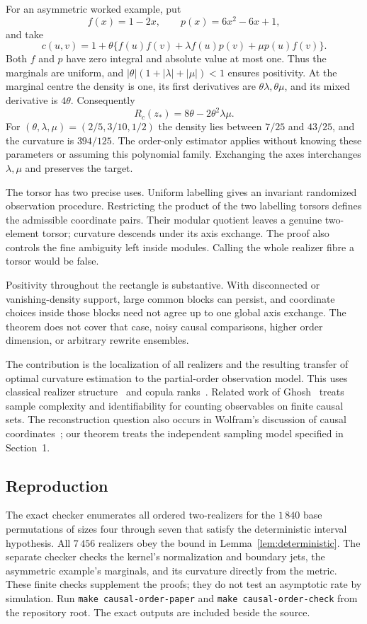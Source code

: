 \documentclass[11pt]{article}
\theoremstyle{remark}
\numberwithin{equation}{section}
\begin{document}
For an asymmetric worked example, put
\[
 f(x)=1-2x,\qquad p(x)=6x^2-6x+1,
\]
and take
\[
 c(u,v)=1+\theta\{f(u)f(v)
             +\lambda f(u)p(v)+\mu p(u)f(v)\}.
\]
Both $f$ and $p$ have zero integral and absolute value at most one.
Thus the marginals are uniform, and
$|\theta|(1+|\lambda|+|\mu|)<1$ ensures positivity.
At the marginal centre the density is one, its first derivatives
are $\theta\lambda,\theta\mu$, and its mixed derivative is $4\theta$.
Consequently
\[
 R_c(z_*)=8\theta-2\theta^2\lambda\mu .
\]
For $(\theta,\lambda,\mu)=(2/5,3/10,1/2)$ the density lies between
$7/25$ and $43/25$, and the curvature is $394/125$.
The order-only estimator applies without knowing these parameters
or assuming this polynomial family.
Exchanging the axes interchanges $\lambda,\mu$ and preserves the target.

The torsor has two precise uses. Uniform labelling gives an invariant
randomized observation procedure. Restricting the product of the two
labelling torsors defines the admissible coordinate pairs.
Their modular quotient leaves a genuine two-element torsor; curvature
descends under its axis exchange. The proof also controls the fine
ambiguity left inside modules. Calling the whole realizer fibre a
torsor would be false.

Positivity throughout the rectangle is substantive.
With disconnected or vanishing-density support, large common blocks
can persist, and coordinate choices inside those blocks need not
agree up to one global axis exchange.
The theorem does not cover that case, noisy causal comparisons,
higher order dimension, or arbitrary rewrite ensembles.

The contribution is the localization of all realizers and the resulting
transfer of optimal curvature estimation to the partial-order observation
model. This uses classical realizer structure~\cite{CP,BBFGP,BCMR} and
copula ranks~\cite{Grubel}. Related work of Ghosh~\cite{Ghosh} treats
sample complexity and identifiability for counting observables on
finite causal sets.
The reconstruction question also occurs in Wolfram's discussion of
causal coordinates~\cite[Section 5.14]{Wolfram}; our theorem treats
the independent sampling model specified in Section~1.

\subsection*{Reproduction}
The exact checker  enumerates all
ordered two-realizers for the $1\,840$ base permutations of sizes four
through seven that satisfy the deterministic interval hypothesis.
All $7\,456$ realizers obey the bound in
Lemma~\ref{lem:deterministic}.
The separate checker  checks the kernel's normalization and
boundary jets, the asymmetric example's marginals, and its curvature
directly from the metric. These finite checks supplement the proofs;
they do not test an asymptotic rate by simulation.
Run \texttt{make causal-order-paper} and
\texttt{make causal-order-check} from the repository root.
The exact outputs are included beside the source.
\end{document}
